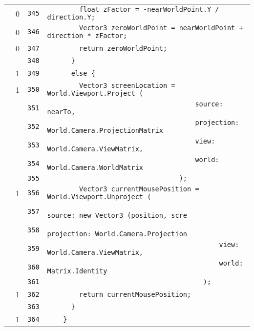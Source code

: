 \documentclass[a4paper,10pt]{article}
\begin{document}
\begin{longtable}[l]{lrrl}
\cellcolor{red} & 0 & \verb~345~ & \verb~        float zFactor = -nearWorldPoint.Y / direction.Y;~\\
\cellcolor{red} & 0 & \verb~346~ & \verb~        Vector3 zeroWorldPoint = nearWorldPoint + direction * zFactor;~\\
\cellcolor{red} & 0 & \verb~347~ & \verb~        return zeroWorldPoint;~\\
\cellcolor{gray} &  & \verb~348~ & \verb~      }~\\
\cellcolor{green} & 1 & \verb~349~ & \verb~      else {~\\
\cellcolor{green} & 1 & \verb~350~ & \verb~        Vector3 screenLocation = World.Viewport.Project (~\\
\cellcolor{gray} &  & \verb~351~ & \verb~                                     source: nearTo,~\\
\cellcolor{gray} &  & \verb~352~ & \verb~                                     projection: World.Camera.ProjectionMatrix~\\
\cellcolor{gray} &  & \verb~353~ & \verb~                                     view: World.Camera.ViewMatrix,~\\
\cellcolor{gray} &  & \verb~354~ & \verb~                                     world: World.Camera.WorldMatrix~\\
\cellcolor{gray} &  & \verb~355~ & \verb~                                 );~\\
\cellcolor{green} & 1 & \verb~356~ & \verb~        Vector3 currentMousePosition = World.Viewport.Unproject (~\\
\cellcolor{gray} &  & \verb~357~ & \verb~                                           source: new Vector3 (position, scre~\\
\cellcolor{gray} &  & \verb~358~ & \verb~                                           projection: World.Camera.Projection~\\
\cellcolor{gray} &  & \verb~359~ & \verb~                                           view: World.Camera.ViewMatrix,~\\
\cellcolor{gray} &  & \verb~360~ & \verb~                                           world: Matrix.Identity~\\
\cellcolor{gray} &  & \verb~361~ & \verb~                                       );~\\
\cellcolor{green} & 1 & \verb~362~ & \verb~        return currentMousePosition;~\\
\cellcolor{gray} &  & \verb~363~ & \verb~      }~\\
\cellcolor{green} & 1 & \verb~364~ & \verb~    }~\\

\end{longtable}
\end{document}
